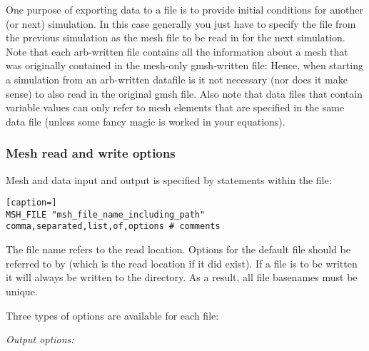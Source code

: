 One purpose of exporting data to a  file is to provide initial conditions for another (or next) simulation.  In this case generally you just have to specify the  file from the previous simulation as the mesh file to be read in for the next simulation.  Note that each arb-written  file contains all the information about a mesh that was originally contained in the mesh-only gmsh-written  file:  Hence, when starting a simulation from an arb-written datafile is it not necessary (nor does it make sense) to also read in the original gmsh  file.  Also note that data files that contain variable values can only refer to mesh elements that are specified in the same data file (unless some fancy  magic is worked in your equations).

\subsubsection{Mesh read and write options}

Mesh and data input and output is specified by  statements within the  file:
%
\begin{lstlisting}[caption=]
MSH_FILE "msh_file_name_including_path" comma,separated,list,of,options # comments
\end{lstlisting}
%
The file name refers to the read location.  Options for the default  file should be referred to by  (which is the read location if it did exist).  If a  file is to be written it will always be written to the  directory.  As a result, all file basenames must be unique.

Three types of options are available for each  file:

\emph{Output options:}

